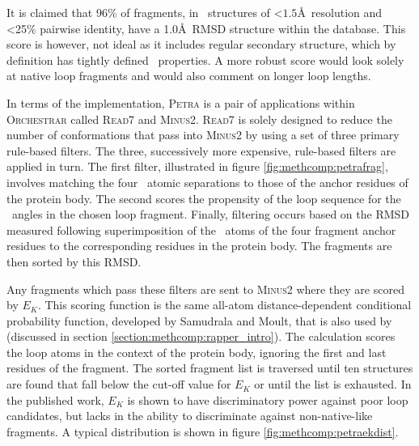 It is claimed that 96\% of  fragments, in \xray\ structures of \textless$1.5$\AA\ resolution and \textless25\% pairwise identity, have a  1.0\AA\ RMSD structure within the database. This score is however, not ideal as it includes regular secondary structure, which by definition has tightly defined \phipsi\ properties. A more robust score would look solely at native loop fragments and would also comment on longer loop lengths.

In terms of the implementation, \textsc{Petra} is a pair of applications within \textsc{Orchestrar} called \textsc{Read7} and \textsc{Minus2}. \textsc{Read7} is solely designed to reduce the number of conformations that pass into \textsc{Minus2} by using a set of three primary rule-based filters.
The three, successively more expensive, rule-based filters are applied in turn. The first filter, illustrated in figure \ref{fig:methcomp:petrafrag},
involves matching the four \ca\ atomic separations
to those of the anchor residues of the protein body. The second scores the propensity of
the loop sequence for the \phipsi\ angles in the chosen loop fragment. Finally,
filtering occurs based on the RMSD measured following superimposition of the \mainchain\ atoms of the
four fragment anchor residues to the corresponding residues in the protein body. The fragments are then sorted by this RMSD.

Any fragments which pass these filters are sent to \textsc{Minus2} where they are scored by $E_K$. This scoring function is the same all-atom distance-dependent conditional probability
function, developed by Samudrala and Moult, that is also used by \rapper\cite{FORCEFIELD:Samudrala1998} (discussed in section \ref{section:methcomp:rapper_intro}). The calculation
scores the loop atoms in the context of the protein body, ignoring the first and last residues of the fragment. The sorted fragment list is traversed until ten structures are found that fall below the cut-off value for $E_K$ or until the list is exhausted.
In the published work, $E_K$ is shown to have discriminatory power against
poor loop candidates, but lacks in the ability to discriminate against non-native-like
fragments. A typical distribution is shown in figure \ref{fig:methcomp:petraekdist}.

